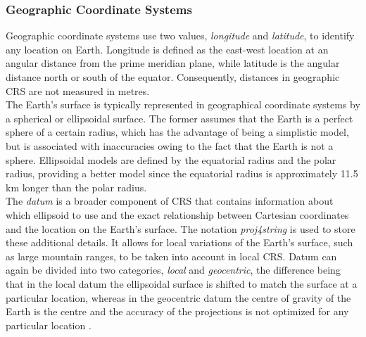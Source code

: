 \subsubsection{Geographic Coordinate Systems}
Geographic coordinate systems use two values, \textit{longitude} and \textit{latitude}, to identify any location on Earth. Longitude is defined as the east-west location at an angular distance from the prime meridian plane, while latitude is the angular distance north or south of the equator. Consequently, distances in geographic CRS are not measured in metres. \\
The Earth's surface is typically represented in geographical coordinate systems by a spherical or ellipsoidal surface. The former assumes that the Earth is a perfect sphere of a certain radius, which has the advantage of being a simplistic model, but is associated with inaccuracies owing to the fact that the Earth is not a sphere. Ellipsoidal models are defined by the equatorial radius and the polar radius, providing a better model since the equatorial radius is approximately 11.5 km longer than the polar radius.\\
The \textit{datum} is a broader component of CRS that contains information about which ellipsoid to use and the exact relationship between Cartesian coordinates and the location on the Earth's surface. The notation \textit{proj4string} is used to store these additional details. It allows for local variations of the Earth's surface, such as large mountain ranges, to be taken into account in local CRS. Datum can again be divided into two categories, \textit{local} and \textit{geocentric}, the difference being that in the local datum the ellipsoidal surface is shifted to match the surface at a particular location, whereas in the geocentric datum the centre of gravity of the Earth is the centre and the accuracy of the projections is not optimized for any particular location \autocite[][]{lovelace2019geocomputation}.
